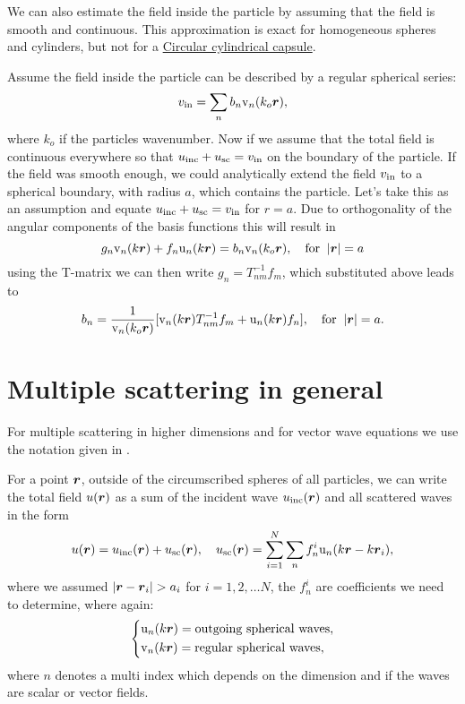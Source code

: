 \documentclass[ 12pt, a4paper]{article}
\begin{document}
We can also estimate the field inside the particle by assuming that the field is smooth and continuous. This approximation is exact for homogeneous spheres and cylinders, but not for a \href{acoustics.pdf}{Circular cylindrical capsule}.

Assume the field inside the particle can be described by a regular spherical series:
\begin{equation}
  v_{\mathrm{in}} = \sum_n b_n \mathrm v_n(k_o \boldsymbol{r}),
\end{equation}
where $k_o$ if the particles wavenumber. Now if we assume that the total field is continuous everywhere so that $u_{\mathrm{inc}} + u_{\mathrm{sc}} = v_{\mathrm{in}}$ on the boundary of the particle. If the field was smooth enough, we could analytically extend the field $v_{\mathrm{in}}$ to a spherical boundary, with radius $a$, which contains the particle. Let's take this as an assumption and equate $u_{\mathrm{inc}} + u_{\mathrm{sc}} = v_{\mathrm{in}}$ for $r=a$. Due to orthogonality of the angular components of the basis functions this will result in
\begin{equation}
   g_n \mathrm v_{n}(k\boldsymbol{r}) + f_n \mathrm u_{n}(k\boldsymbol{r}) = b_n \mathrm v_n(k_o \boldsymbol{r}), \quad \text{for} \;\; |\boldsymbol{r}| = a
\end{equation}
using the T-matrix we can then write $g_n = T_{nm}^{-1} f_m$, which substituted above leads to
\begin{equation}
    b_n = \frac{1}{\mathrm v_n(k_o \boldsymbol{r})}[ \mathrm v_{n}(k\boldsymbol{r}) T_{nm}^{-1} f_m + \mathrm u_{n}(k\boldsymbol{r}) f_n], \quad \text{for} \;\; |\boldsymbol{r}| = a.
\end{equation}

\section{Multiple scattering in general}

For multiple scattering in higher dimensions and for vector wave equations we use the notation given in \cite{gower2020effective}.

For a point $\boldsymbol{r}$, outside of the circumscribed spheres of all particles, we can write the total field $u(\boldsymbol{r})$ as a sum of the incident wave $u_{\mathrm{inc}}(\boldsymbol{r})$ and all scattered waves in the form~\cite{Kristensson2015a,Kristensson2016,Linton+Martin2006}
\begin{equation}
    u(\boldsymbol{r}) = u_{\mathrm{inc}}(\boldsymbol{r}) + u_{\mathrm{sc}}(\boldsymbol{r}), \quad u_{\mathrm{sc}}(\boldsymbol{r}) =  \sum_{i=1}^N \sum_n f_n^i \mathrm u_n (k \boldsymbol{r} - k \boldsymbol{r}_i),
    \label{eqn:total_discrete_wave}
\end{equation}
where we assumed $ |\boldsymbol{r} - \boldsymbol{r}_i| > a_i $ for $i=1,2,\ldots N$, the $f_n^i$ are coefficients we need to determine, where again:
\begin{equation}
\left\{\begin{aligned}
    & \mathrm u_{n}(k\boldsymbol{r}) = \text{outgoing spherical waves},
    \label{eqn:outgoing_waves_and_regular_waves}
    \\
    & \mathrm v_{n}(k\boldsymbol{r})= \text{regular spherical waves},
 \end{aligned}\right.
\end{equation}
where $n$ denotes a multi index which depends on the dimension and if the waves are scalar or vector fields.
\end{document}
